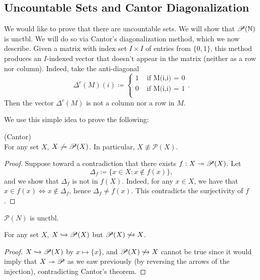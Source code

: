 \documentclass[14pt,oneside]{extarticle}
\begin{document}
\subsection{Uncountable Sets and Cantor Diagonalization}
We would like to prove that there are uncountable sets. We will show that $\mathscr{P}(\mathbb{N})$ is unctbl. We will do so via Cantor's diagonalization method, which we now describe. Given a matrix with index set $I \times I$ of entries from $\{0,1\}$, this method produces an $I$-indexed vector that doesn't appear in the matrix (neither as a row nor column). Indeed, take the anti-diagonal
\[\Delta^c(M)(i) \coloneqq \begin{cases}
  1 & \text{ if M(i,i) = 0} \\
  0 & \text{ if M(i,i) = 1} \\
\end{cases}.\]
Then the vector $\Delta^c(M)$ is not a column nor a row in $M$. 

\pic

We use this simple idea to prove the following:

\begin{theorem*} (Cantor)\\
  For any set $X$, $X \not\twoheadrightarrow{} \mathscr{P}(X)$. In particular, $X \not\equiv \mathscr{P}(X)$.
\end{theorem*}
\pic
\begin{proof}
  Suppose toward a contradiction that there exists $f: X \twoheadrightarrow{} \mathscr{P}(X)$. Let \[\Delta_f \coloneqq \{x \in X: x \notin f(x)\},\] and we show that $\Delta_f$ is not in $f(X)$. Indeed, for any $x \in X$, we have that $x \in f(x) \iff x \notin \Delta_f$, hence $\Delta_f \neq f(x)$. This contradicts the surjectivity of $f$.
\end{proof}

\begin{corollary*}
  $\mathscr{P}(N)$ is unctbl.
\end{corollary*}

\begin{corollary*}
  For any set $X$, $X \xhookrightarrow{} \mathscr{P}(X)$ but $\mathscr{P}(X) \not\xhookrightarrow{} X$.
\end{corollary*}
\begin{proof}
  $X \xhookrightarrow{} \mathscr{P}(X)$ by $x \mapsto \{x\}$, and $\mathscr{P}(X) \not\xhookrightarrow{} X$ cannot be true since it would imply that $X \twoheadrightarrow{} \mathscr{P}$ as we saw previously (by reversing the arrows of the injection), contradicting Cantor's theorem.
\end{proof}
\end{document}
